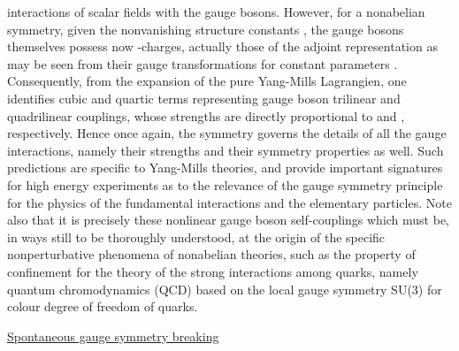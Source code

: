 \documentclass[a4paper,11pt]{article}
\begin{document}
interactions of scalar fields with the gauge bosons. However, for a nonabelian
symmetry, given the nonvanishing structure constants \coordHE{}, the gauge
bosons themselves possess now \coordHE{}-charges, actually those of the adjoint
representation as may be seen from their gauge transformations for constant
parameters \coordHE{}. Consequently, from the expansion of
the pure Yang-Mills Lagrangien, one identifies cubic and quartic terms
representing gauge boson trilinear and quadrilinear couplings, whose
strengths are directly proportional to \coordHE{} and \coordHE{}, respectively.
Hence once again, the symmetry governs the details of all the gauge
interactions, namely their strengths and their symmetry properties as well.
Such predictions are specific to Yang-Mills theories, and provide important
signatures for high energy experiments as to the relevance of the gauge 
symmetry principle for the physics of the fundamental interactions and the
elementary particles. Note also that it is precisely these nonlinear
gauge boson self-couplings which must be, in ways still to be thoroughly
understood, at the origin of the specific nonperturbative phenomena of 
nonabelian theories, such as the property of confinement for the theory of 
the strong interactions among quarks, namely quantum chromodynamics (QCD) 
based on the local gauge symmetry SU(3)\coordHE{} for colour degree of freedom 
of quarks.

\vspace{10pt}

\noindent\underline{Spontaneous gauge symmetry breaking}

\vspace{5pt}
\end{document}
